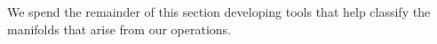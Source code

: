 %	
%			
%
%				
%				
%				
%
We spend the remainder of this section developing tools that help classify the manifolds that arise from our operations.

